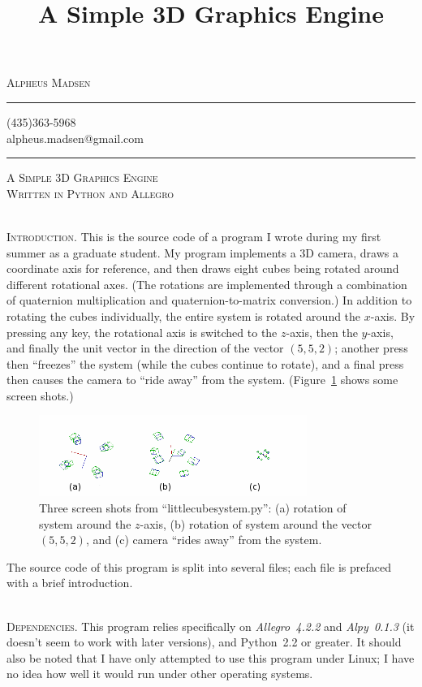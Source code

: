 \documentclass[12pt]{article}
\title{A Simple 3D Graphics Engine}
\author{\headerstuff}
\date{}
\makeatletter
\newcommand{\titleize}[1]{
   \begin{center}
       \Large \textsc{#1} \normalsize \\
   \end{center}
}
\newcommand{\normaltitleize}[1]{\mbox{}\\ \textsc{#1} \normalsize}
\newcommand{\headerstuff}{
   \begin{center}
   \textsc{\Large{Alpheus Madsen}}

   \rule{1in}{.01in}

   (435)363-5968 \\

   alpheus.madsen@gmail.com

   \rule{2in}{.01in}
   \end{center}
}
\makeatother
\begin{document}

\headerstuff

\titleize{A Simple 3D Graphics Engine\\Written in Python and Allegro}

\normaltitleize{Introduction.}  This is the source code of a program I wrote during my first summer as a graduate student.  My program implements a 3D camera, draws a coordinate axis for reference, and then draws eight cubes being rotated around different rotational axes.  (The rotations are implemented through a combination of quaternion multiplication and quaternion-to-matrix conversion.)  In addition to rotating the cubes individually, the entire system is rotated around the $x$-axis.  By pressing any key, the rotational axis is switched to the $z$-axis, then the $y$-axis, and finally the unit vector in the direction of the vector $(5, 5, 2)$; another press then ``freezes'' the system (while the cubes continue to rotate), and a final press then causes the camera to ``ride away'' from the system.  (Figure~\ref{screenshots} shows some screen shots.)

\begin{figure}[!hbtp]
   \includegraphics{screenshots4.png}
\caption{Three screen shots from ``littlecubesystem.py'': (a) rotation of system around the $z$-axis, (b) rotation of system around the vector $(5, 5, 2)$, and (c) camera ``rides away'' from the system.}\label{screenshots}
\end{figure}

The source code of this program is split into several files; each file is prefaced with a brief introduction.

\normaltitleize{Dependencies.}  This program relies specifically on \emph{Allegro~4.2.2} and \emph{Alpy~0.1.3} (it doesn't seem to work with later versions), and Python~2.2 or greater.  It should also be noted that I have only attempted to use this program under Linux; I have no idea how well it would run under other operating systems.
\end{document}
